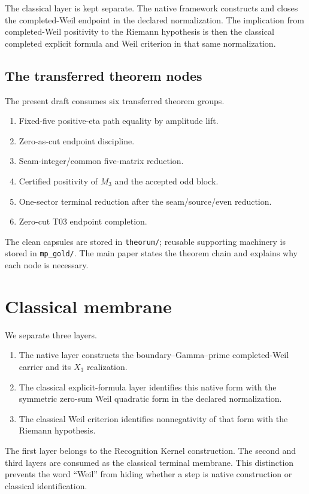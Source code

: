 \documentclass[11pt]{article}
\begin{document}
The classical layer is kept separate.  The native framework constructs and closes the completed-Weil endpoint in the declared normalization.  The implication from completed-Weil positivity to the Riemann hypothesis is then the classical completed explicit formula and Weil criterion in that same normalization.

\subsection{The transferred theorem nodes}

The present draft consumes six transferred theorem groups.
\begin{enumerate}[label=(T\arabic*)]
\item Fixed-five positive-eta path equality by amplitude lift.
\item Zero-as-cut endpoint discipline.
\item Seam-integer/common five-matrix reduction.
\item Certified positivity of \(M_3\) and the accepted odd block.
\item One-sector terminal reduction after the seam/source/even reduction.
\item Zero-cut T03 endpoint completion.
\end{enumerate}
The clean capsules are stored in \texttt{theorum/}; reusable supporting machinery is stored in \texttt{mp\_gold/}.  The main paper states the theorem chain and explains why each node is necessary.

\section{Classical membrane}

We separate three layers.
\begin{enumerate}[label=(\alph*)]
\item The native layer constructs the boundary--Gamma--prime completed-Weil carrier and its \(X_3\) realization.
\item The classical explicit-formula layer identifies this native form with the symmetric zero-sum Weil quadratic form in the declared normalization.
\item The classical Weil criterion identifies nonnegativity of that form with the Riemann hypothesis.
\end{enumerate}
The first layer belongs to the Recognition Kernel construction.  The second and third layers are consumed as the classical terminal membrane.  This distinction prevents the word ``Weil'' from hiding whether a step is native construction or classical identification.
\end{document}
